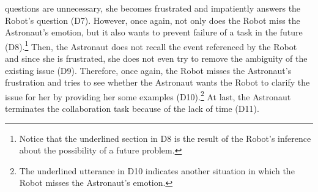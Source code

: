 questions are unnecessary, she becomes frustrated and impatiently answers the
Robot's question (D7). However, once again, not only does the Robot miss the
Astronaut's emotion, but it also wants to prevent failure of a task in the
future (D8).\footnote{Notice that the underlined section in D8 is the result of
the Robot's inference about the possibility of a future problem.} Then, the
Astronaut does not recall the event referenced by the Robot and since she is
frustrated, she does not even try to remove the ambiguity of the existing issue
(D9). Therefore, once again, the Robot misses the Astronaut's frustration and
tries to see whether the Astronaut wants the Robot to clarify the issue for her
by providing her some examples (D10).\footnote{The underlined utterance in D10
indicates another situation in which the Robot misses the Astronaut's emotion.}
At last, the Astronaut terminates the collaboration task because of the lack of
time (D11).

